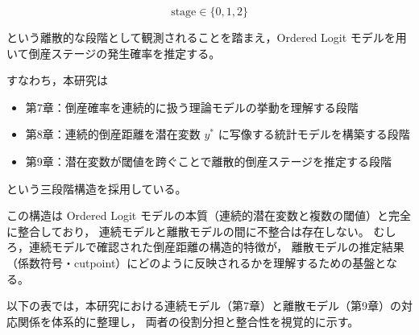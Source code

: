 \[
\text{stage} \in \{0,1,2\}
\]


という離散的な段階として観測されることを踏まえ，Ordered Logit モデルを用いて倒産ステージの発生確率を推定する。

すなわち，本研究は
\begin{itemize}
    \item 第7章：倒産確率を連続的に扱う理論モデルの挙動を理解する段階
    \item 第8章：連続的倒産距離を潜在変数 $y^*$ に写像する統計モデルを構築する段階
    \item 第9章：潜在変数が閾値を跨ぐことで離散的倒産ステージを推定する段階
\end{itemize}
という三段階構造を採用している。

この構造は Ordered Logit モデルの本質（連続的潜在変数と複数の閾値）と完全に整合しており，
連続モデルと離散モデルの間に不整合は存在しない。
むしろ，連続モデルで確認された倒産距離の構造的特徴が，
離散モデルの推定結果（係数符号・cutpoint）にどのように反映されるかを理解するための基盤となる。

以下の表では，本研究における連続モデル（第7章）と離散モデル（第9章）の対応関係を体系的に整理し，
両者の役割分担と整合性を視覚的に示す。

